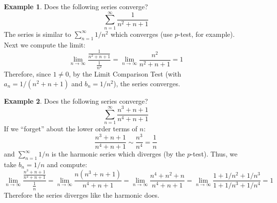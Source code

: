 \documentclass[12pt]{article}
\theoremstyle{definition}
\newtheorem{exa}{Example}
\newcommand{\limn}{\lim_{n\to\infty}}
\newcommand{\sumn}{\sum_{n=1}^\infty }
\begin{document}
\begin{exa}
Does the following series converge?
$$\sumn \frac{1}{n^2+n+1}$$
The series is similar to $\sumn 1/n^2$ which converges (use $p$-test, for example). Next we compute the limit:
$$\limn \frac{\frac{1}{n^2+n+1}}{\frac{1}{n^2}}=\limn \frac{n^2}{n^2+n+1} = 1$$
Therefore, since $1\neq 0$, by the Limit Comparison Test (with $a_n=1/(n^2+n+1)$ and $b_n=1/n^2$), the series converges.\\
\end{exa}

\begin{exa}
Does the following series converge?
$$\sumn \frac{n^3+n+1}{n^4+n+1}$$
If we ``forget'' about the lower order terms of $n$:
$$\frac{n^3+n+1}{n^4+n+1} \sim \frac{n^3}{n^4}=\frac{1}{n}$$
and $\sumn 1/n$ is the harmonic series which diverges (by the $p$-test). Thus, we take $b_n=1/n$ and compute:
$$\limn \frac{\frac{n^3+n+1}{n^4+n+1}}{\frac{1}{n}}=\limn \frac{n(n^3+n+1)}{n^4+n+1}=
\limn \frac{n^4+n^2+n}{n^4+n+1}=\limn \frac{1+1/n^2+1/n^3}{1+1/n^3+1/n^4}=1$$
Therefore the series diverges like the harmonic does.\\
\end{exa}
\end{document}
